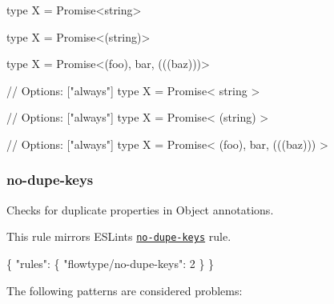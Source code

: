 \begin{DoxyCode}
type X = Promise<string>

type X = Promise<(string)>

type X = Promise<(foo), bar, (((baz)))>

// Options: ["always"]
type X = Promise< string >

// Options: ["always"]
type X = Promise< (string) >

// Options: ["always"]
type X = Promise< (foo), bar, (((baz))) >
\end{DoxyCode}


\label{_eslint-plugin-flowtype-rules-no-dupe-keys}%
 \subsubsection*{{\ttfamily no-\/dupe-\/keys}}

Checks for duplicate properties in Object annotations.

This rule mirrors E\+S\+Lint\textquotesingle{}s \href{http://eslint.org/docs/rules/no-dupe-keys}{\tt no-\/dupe-\/keys} rule.


\begin{DoxyCode}
\{
    "rules": \{
        "flowtype/no-dupe-keys": 2
    \}
\}
\end{DoxyCode}


The following patterns are considered problems\+:


